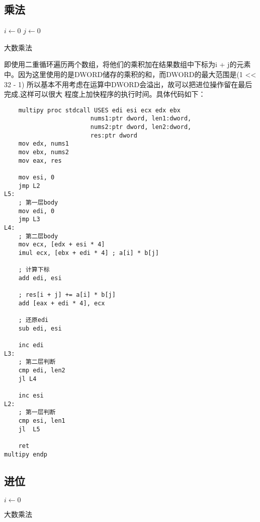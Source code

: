 \subsection{乘法}
\begin{algorithm}[H]
    \SetAlgoLined
    $i \leftarrow 0$ \;
    $j \leftarrow 0$ \;
    \caption{大数乘法}
\end{algorithm}

即使用二重循环遍历两个数组，将他们的乘积加在结果数组中下标为i + j的元素
中。因为这里使用的是DWORD储存的乘积的和，而DWORD的最大范围是(1 << 32 - 1)
所以基本不用考虑在运算中DWORD会溢出，故可以把进位操作留在最后完成,这样可以很大
程度上加快程序的执行时间。具体代码如下：

\begin{lstlisting}
    multipy proc stdcall USES edi esi ecx edx ebx 
                        nums1:ptr dword, len1:dword, 
                        nums2:ptr dword, len2:dword, 
                        res:ptr dword
    mov edx, nums1
    mov ebx, nums2
    mov eax, res

    mov esi, 0
    jmp L2
L5:
    ; 第一层body
    mov edi, 0
    jmp L3
L4:
    ; 第二层body
    mov ecx, [edx + esi * 4]
    imul ecx, [ebx + edi * 4] ; a[i] * b[j]
   
    ; 计算下标
    add edi, esi

    ; res[i + j] += a[i] * b[j]
    add [eax + edi * 4], ecx 

    ; 还原edi
    sub edi, esi

    inc edi
L3:
    ; 第二层判断
    cmp edi, len2
    jl L4

    inc esi
L2:
    ; 第一层判断
    cmp esi, len1
    jl  L5

    ret
multipy endp
\end{lstlisting}


\subsection{进位}
\begin{algorithm}[H]
    \SetAlgoLined
    $i \leftarrow 0$ \;
    \caption{大数乘法}
\end{algorithm}

